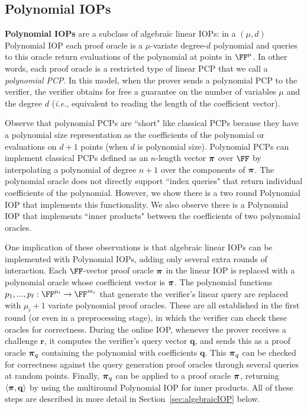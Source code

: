 \subsection{Polynomial IOPs} 
\textbf{Polynomial IOPs} are a subclass of algebraic linear IOPs: in a $(\mu, d)$ Polynomial IOP each proof oracle is a $\mu$-variate degree-$d$ polynomial and queries to this oracle return evaluations of the polynomial at points in $\FF^\mu$. In other words, each proof oracle is a restricted type of linear PCP that we call a \emph{polynomial PCP}. In this model, when the prover sends a polynomial PCP to the verifier, the verifier obtains for free a guarantee on the number of variables $\mu$ and the degree $d$ (\emph{i.e.}, equivalent to reading the length of the coefficient vector). 

Observe that polynomial PCPs are ``short" like classical PCPs because they have a polynomial size representation as the coefficients of the polynomial or evaluations on $d+1$ points (when $d$ is polynomial size). Polynomial PCPs can implement classical PCPs defined as an $n$-length vector $\boldsymbol{\pi}$ over $\FF$ by interpolating a polynomial of degree $n+1$ over the components of $\boldsymbol{\pi}$. The polynomial oracle does not directly support ``index queries" that return individual coefficients of the polynomial. However, we show there is a two round Polynomial IOP that implements this functionality. We also observe there is a Polynomial IOP that implements ``inner products" between the coefficients of two polynomial oracles. 


One implication of these observations is that algebraic linear IOPs can be implemented with Polynomial IOPs, adding only several extra rounds of interaction. Each $\FF$-vector proof oracle $\boldsymbol{\pi}$ in the linear IOP is replaced with a polynomial oracle whose coefficient vector is $\boldsymbol{\pi}$. The polynomial functions $p_1,...,p_\ell: \FF^{\mu_i} \rightarrow \FF^{m_i}$ that generate the verifier's linear query are replaced with $\mu_i+1$ variate polynomial proof oracles. These are all established in the first round (or even in a preprocessing stage), in which the verifier can check these oracles for correctness. During the online IOP, whenever the prover receives a challenge $\mathbf{r}$, it computes the verifier's query vector $\mathbf{q}$, and sends this as a proof oracle $\boldsymbol{\pi}_q$ containing the polynomial with coefficients $\mathbf{q}$. This $\boldsymbol{\pi}_q$ can be checked for correctness against the query generation proof oracles through several queries at random points. Finally, $\boldsymbol{\pi}_q$ can be applied to a proof oracle $\boldsymbol{\pi}$, returning $\langle \boldsymbol{\pi}, \mathbf{q} \rangle$ by using the multiround Polynomial IOP for inner products. All of these steps are described in more detail in Section~\ref{sec:algebraicIOP} below. 
\fi 



